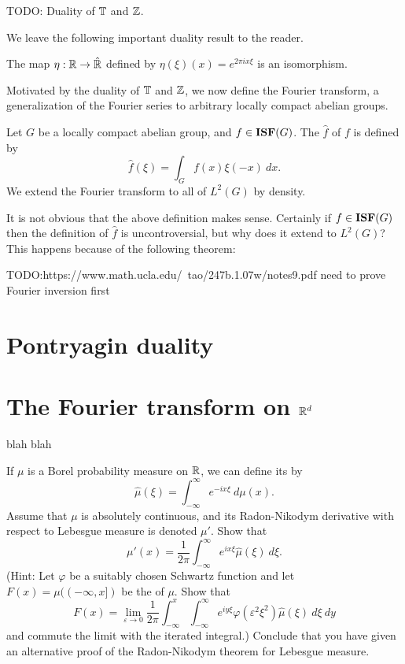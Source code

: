 \begin{example}
TODO: Duality of $\mathbb{T}$ and $\mathbb{Z}$.
\end{example}

We leave the following important duality result to the reader.
\begin{theorem}
The map $\eta: \mathbb{R} \to \hat {\mathbb{R}}$ defined by $\eta(\xi)(x) = e^{2\pi ix\xi}$ is an isomorphism.
\end{theorem}

Motivated by the duality of $\mathbb{T}$ and $\mathbb{Z}$, we now define the Fourier transform, a generalization of the Fourier series to arbitrary locally compact abelian groups.
\begin{definition}
Let $G$ be a locally compact abelian group, and $f \in \mathbf{ISF}(G)$. The  $\hat f$ of $f$ is defined by
$$\hat f(\xi) = \int_G f(x) \xi(-x)~dx.$$
We extend the Fourier transform to all of $L^2(G)$ by density.
\end{definition}
It is not obvious that the above definition makes sense. Certainly if $f \in \mathbf{ISF}(G)$ then the definition of $\hat f$ is uncontroversial, but why does it extend to $L^2(G)$?
This happens because of the following theorem:
\begin{theorem}[Plancherel]
TODO:https://www.math.ucla.edu/~tao/247b.1.07w/notes9.pdf
need to prove Fourier inversion first
\end{theorem}


\section{Pontryagin duality}

\section{The Fourier transform on $\mathbb{R}^d$}

blah blah

\begin{exercise}
If $\mu$ is a Borel probability measure on $\mathbb{R}$, we can define its  by
$$\hat \mu(\xi) = \int_{-\infty}^\infty e^{-ix\xi} ~d\mu(x).$$
Assume that $\mu$ is absolutely continuous, and its Radon-Nikodym derivative with respect to Lebesgue measure is denoted $\mu'$. Show that
$$\mu'(x) = \frac{1}{2\pi} \int_{-\infty}^\infty e^{ix\xi} \hat \mu(\xi)~d\xi.$$
(Hint: Let $\varphi$ be a suitably chosen Schwartz function and let $F(x) = \mu((-\infty, x])$ be the  of $\mu$. Show that
$$F(x) = \lim_{\varepsilon \to 0} \frac{1}{2\pi} \int_{-\infty}^x \int_{-\infty}^\infty e^{iy\xi} \varphi(\varepsilon^2 \xi^2) \hat \mu(\xi) ~d\xi ~dy$$
and commute the limit with the iterated integral.)
Conclude that you have given an alternative proof of the Radon-Nikodym theorem for Lebesgue measure.
\end{exercise}

